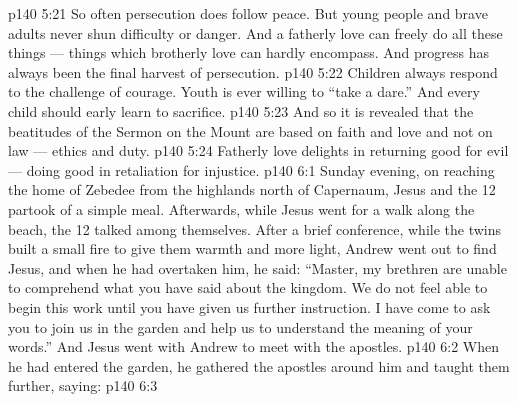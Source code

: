 \vs p140 5:21 So often persecution does follow peace. But young people and brave adults never shun difficulty or danger.  And a fatherly love can freely do all these things --- things which brotherly love can hardly encompass. And progress has always been the final harvest of persecution.
\vs p140 5:22 Children always respond to the challenge of courage. Youth is ever willing to “take a dare.” And every child should early learn to sacrifice.
\vs p140 5:23 \pc And so it is revealed that the beatitudes of the Sermon on the Mount are based on faith and love and not on law --- ethics and duty.
\vs p140 5:24 \pc Fatherly love delights in returning good for evil --- doing good in retaliation for injustice.
\vs p140 6:1 Sunday evening, on reaching the home of Zebedee from the highlands north of Capernaum, Jesus and the 12 partook of a simple meal. Afterwards, while Jesus went for a walk along the beach, the 12 talked among themselves. After a brief conference, while the twins built a small fire to give them warmth and more light, Andrew went out to find Jesus, and when he had overtaken him, he said: “Master, my brethren are unable to comprehend what you have said about the kingdom. We do not feel able to begin this work until you have given us further instruction. I have come to ask you to join us in the garden and help us to understand the meaning of your words.” And Jesus went with Andrew to meet with the apostles.
\vs p140 6:2 When he had entered the garden, he gathered the apostles around him and taught them further, saying: 
\vs p140 6:3 
